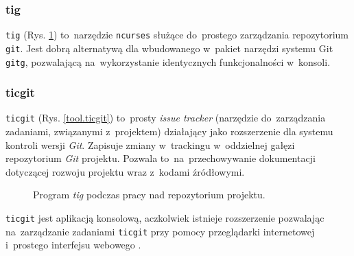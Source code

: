 \subsubsection{tig}

\texttt{tig} (Rys. \ref{tool.tig}) to~narzędzie \texttt{ncurses} służące do~prostego zarządzania repozytorium \texttt{git}. Jest dobrą alternatywą dla wbudowanego w~pakiet narzędzi systemu Git \texttt{gitg}, pozwalającą na~wykorzystanie identycznych funkcjonalności w~konsoli.

\subsubsection{ticgit}

\texttt{ticgit} \cite{ticgit} (Rys. \ref{tool.ticgit}) to~prosty \textit{issue tracker} (narzędzie do~zarządzania zadaniami, związanymi z~projektem) działający jako rozszerzenie dla systemu kontroli wersji \textit{Git}. Zapisuje zmiany w~trackingu w~oddzielnej gałęzi repozytorium \textit{Git} projektu. Pozwala to~na~przechowywanie dokumentacji dotyczącej rozwoju projektu wraz z~kodami źródłowymi.

\begin{figure}[ht]
\centering
{}
\caption{Program \textit{tig} podczas pracy nad repozytorium projektu.}
\label{tool.tig}
\end{figure}

\texttt{ticgit} jest aplikacją konsolową, aczkolwiek istnieje rozszerzenie pozwalając na~zarządzanie zadaniami \texttt{ticgit} przy pomocy przeglądarki internetowej i~prostego interfejsu webowego \cite{ticgitweb}.

